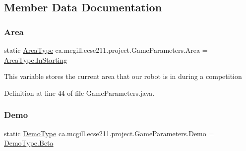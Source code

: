 \subsection{Member Data Documentation}
\mbox{\label{enumca_1_1mcgill_1_1ecse211_1_1project_1_1_game_parameters_a32080f9c0e2e23c0feefc272620a07ad}} 
\subsubsection{\texorpdfstring{Area}{Area}}
{\footnotesize\ttfamily  static  \hyperlink{enumca_1_1mcgill_1_1ecse211_1_1project_1_1_game_parameters_1_1_area_type}{Area\+Type} ca.\+mcgill.\+ecse211.\+project.\+Game\+Parameters.\+Area = \hyperlink{enumca_1_1mcgill_1_1ecse211_1_1project_1_1_game_parameters_1_1_area_type_a90e9cb33114c7af62aa86684942265e5}{Area\+Type.\+In\+Starting}\hspace{0.3cm}{\ttfamily [static]}}

This variable stores the current area that our robot is in during a competition 

Definition at line 44 of file Game\+Parameters.\+java.

\mbox{\label{enumca_1_1mcgill_1_1ecse211_1_1project_1_1_game_parameters_a36e932159f5f7e0f5e2e78f00d6f7e93}} 
\subsubsection{\texorpdfstring{Demo}{Demo}}
{\footnotesize\ttfamily  static  \hyperlink{enumca_1_1mcgill_1_1ecse211_1_1project_1_1_game_parameters_1_1_demo_type}{Demo\+Type} ca.\+mcgill.\+ecse211.\+project.\+Game\+Parameters.\+Demo = \hyperlink{enumca_1_1mcgill_1_1ecse211_1_1project_1_1_game_parameters_1_1_demo_type_a8d4e576df991cb52b50ae54b2812aa7f}{Demo\+Type.\+Beta}\hspace{0.3cm}{\ttfamily [static]}}

